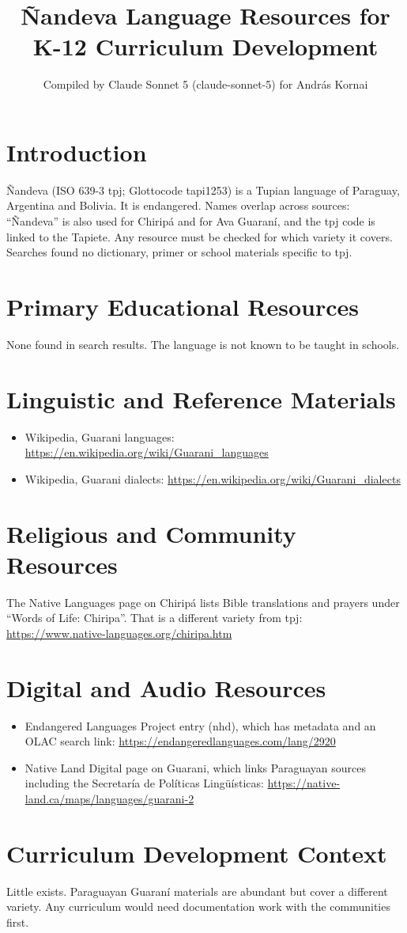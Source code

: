 \documentclass[12pt]{article}
\title{{\~N}andeva Language Resources for K-12 Curriculum Development}
\author{Compiled by Claude Sonnet 5 (claude-sonnet-5) for Andr\'as Kornai}
\date{}
\begin{document}
\maketitle
\section{Introduction}
{\~N}andeva (ISO 639-3 tpj; Glottocode tapi1253) is a Tupian language of Paraguay, Argentina and Bolivia. It is endangered. Names overlap across sources: ``{\~N}andeva'' is also used for Chirip\'a and for Ava Guaran\'i, and the tpj code is linked to the Tapiete. Any resource must be checked for which variety it covers. Searches found no dictionary, primer or school materials specific to tpj.
\section{Primary Educational Resources}
None found in search results. The language is not known to be taught in schools.
\section{Linguistic and Reference Materials}
\begin{itemize}
\item Wikipedia, Guarani languages: \url{https://en.wikipedia.org/wiki/Guarani_languages}
\item Wikipedia, Guarani dialects: \url{https://en.wikipedia.org/wiki/Guarani_dialects}
\end{itemize}
\section{Religious and Community Resources}
The Native Languages page on Chirip\'a lists Bible translations and prayers under ``Words of Life: Chiripa''. That is a different variety from tpj: \url{https://www.native-languages.org/chiripa.htm}
\section{Digital and Audio Resources}
\begin{itemize}
\item Endangered Languages Project entry (nhd), which has metadata and an OLAC search link: \url{https://endangeredlanguages.com/lang/2920}
\item Native Land Digital page on Guarani, which links Paraguayan sources including the Secretar\'ia de Pol\'iticas Ling\"u\'isticas: \url{https://native-land.ca/maps/languages/guarani-2}
\end{itemize}
\section{Curriculum Development Context}
Little exists. Paraguayan Guaran\'i materials are abundant but cover a different variety. Any curriculum would need documentation work with the communities first.
\end{document}
